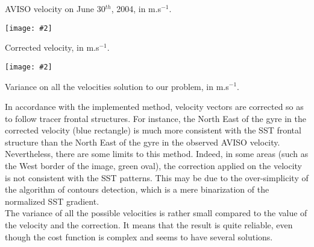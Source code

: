 \documentclass[portrait,a0b,final,a4resizeable]{a0poster}
\newenvironment{poster}{
  \begin{center}
  \begin{minipage}[c]{1.0\textwidth}
}{
  \end{minipage} 
  \end{center}
}
\newcommand{\myfig}[3][0]{
\begin{center}
  \vspace{0.10cm}
  \texttt{[image: \#2]}
\end{center}}
\begin{document}
\begin{poster}
\begin{center}
{{\begin{center}
{\begin{minipage}{0.32\textwidth}
          \small{AVISO velocity on June 30$^{th}$, 2004, in m.s$^{-1}$.}
        \end{minipage}
        \begin{minipage}{0.32\textwidth}
          \myfig{./pict/aviso_19904_med_mean_circle.eps}{0.8}
          \small{Corrected velocity, in m.s$^{-1}$.}
        \end{minipage}
        \begin{minipage}{0.32\textwidth}
          \vspace{3mm}
          \myfig{./pict/aviso_norm19904_med_var_bin0.eps}{0.86}
          \small{Variance on all the velocities solution to our problem, in m.s$^{-1}$.}
        \end{minipage}
      }   
      \end{center}
      \vspace{1em}
       In accordance with the implemented method, velocity vectors are corrected so as to follow tracer frontal structures. For instance, the North East of the gyre in the corrected velocity (blue rectangle) is much more consistent with the SST frontal structure than the North East of the gyre in the observed AVISO velocity. \\  
       Nevertheless, there are some limits to this method. 
      Indeed, in some areas (such as the West border of the image, green oval), the correction applied on the velocity is not consistent with the SST patterns. 
      This may be due to the over-simplicity of the algorithm of contours detection, which is a mere binarization of the normalized SST gradient. \\ 
        The variance of all the possible velocities is rather small compared to the value of the velocity and the correction. 
       It means that the result is quite reliable, even though the cost function is complex and seems to have several solutions. 
}}
\end{center}
\end{poster}
\end{document}
